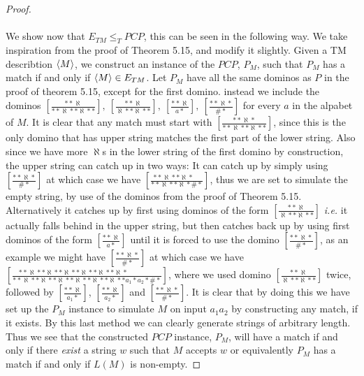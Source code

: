 \documentclass[a4paper,11pt]{article}
\newcommand{\ie}{\emph{i.e.} }
\numberwithin{equation}{section}
\begin{document}
\begin{proof}
\\
\\
We show now that $ E_{TM}\leq_T PCP $, this can be seen in the following way. We take inspiration from the proof of Theorem 5.15, and modify it slightly. Given a TM describtion $ \braket{M} $, we construct an instance of the $ PCP $, $ P_M $, such that $ P_M $ has a match if and only if $ \braket{M}\in E_{TM} $. 
Let $ P_M $ have all the same dominos as $ P $ in the proof of theorem 5.15, except for the first domino. instead we include the dominos $ \left[\frac{\ast\ast\aleph}{\ast\ast\aleph\ast\ast\aleph\ast\ast}\right],\ \left[\frac{\ast\ast\aleph}{\aleph\ast\ast\aleph\ast\ast}\right],\ \left[\frac{\ast\ast\aleph}{a\ast}\right],\ \left[\frac{\ast\ast\aleph\ast}{\#\ast}\right] $ for every $ a $ in the alpabet of $ M $. It is clear that any match must start with $ \left[\frac{\ast\ast\aleph\ast}{\ast\ast\aleph\ast\ast\aleph\ast\ast}\right] $, since this is the only domino that has upper string matches the first part of the lower string. Also since we have more $ \aleph $s in the lower string of the first domino by construction, the upper string can catch up in two ways: It can catch up by simply using $ \left[\frac{\ast\ast\aleph\ast}{\#\ast}\right]  $ at which case we have $ \left[\frac{\ast\ast\aleph\ast\ast\aleph\ast\quad }{\ast\ast\aleph\ast\ast\aleph\ast\#\ast}\right] $, thus we are set to simulate the empty string, by use of the dominos from the proof of Theorem 5.15.
Alternatively it catches up by first using dominos of the form $ \left[\frac{\ast\ast\aleph}{\aleph\ast\ast\aleph\ast\ast}\right] $ \ie it actually falls behind in the upper string, but then catches back up by using first dominos of the form $ \left[\frac{\ast\ast\aleph}{a\ast}\right] $ until it is forced to use the domino $ \left[\frac{\ast\ast\aleph\ast}{\#\ast}\right] $, as an example we might have $ \left[\frac{\ast\ast\aleph\ast}{\#\ast}\right]  $ at which case we have $ \left[\frac{\ast\ast\aleph\ast\ast\aleph\ast\ast\aleph\ast\ast\aleph\ast\ast\aleph\ast\ast\aleph\ast\quad\quad \qquad }{\ast\ast\aleph\ast\ast\aleph\ast\ast\aleph\ast\ast\aleph\ast\ast\aleph\ast\ast\aleph\ast\ast a_1\ast a_2\ast\#\ast}\right] $, where we used domino $ \left[\frac{\ast\ast\aleph}{\aleph\ast\ast\aleph\ast\ast}\right] $ twice, followed by $ \left[\frac{\ast\ast\aleph}{a_1\ast}\right] $, $ \left[\frac{\ast\ast\aleph}{a_2\ast}\right] $ and $ \left[\frac{\ast\ast\aleph\ast}{\#\ast}\right] $. It is clear that by doing this we have set up the $ P_M $ instance to simulate $ M $ on input $ a_1a_2 $ by constructing any match, if it exists. By this last method we can clearly generate strings of arbitrary length. Thus we see that the constructed $ PCP $ instance, $ P_M $, will have a match if and  only if there \emph{exist} a string $ w $ such that $ M $ accepts $ w $ or equivalently $ P_M $ has a match if and only if $ L(M) $ is non-empty.  

\end{proof}
\end{document}
